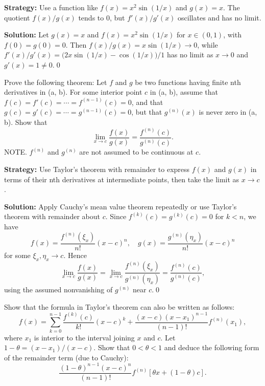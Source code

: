 \noindent\textbf{Strategy:} Use a function like \( f(x) = x^2 \sin(1/x) \) and \( g(x) = x \). The quotient \( f(x)/g(x) \) tends to 0, but \( f'(x)/g'(x) \) oscillates and has no limit.

\bigskip\noindent\textbf{Solution:}
Let $g(x)=x$ and $f(x)=x^2\sin(1/x)$ for $x\in(0,1)$, with $f(0)=g(0)=0$. Then $f(x)/g(x)=x\sin(1/x)\to 0$, while $f'(x)/g'(x)=\big(2x\sin(1/x)-\cos(1/x)\big)/1$ has no limit as $x\to 0$ and $g'(x)=1\ne 0$.\qed


\begin{problembox}
\begin{problemstatement}
Prove the following theorem: Let \( f \) and \( g \) be two functions having finite nth derivatives in (a, b). For some interior point \( c \) in (a, b), assume that \( f(c) = f'(c) = \cdots = f^{(n-1)}(c) = 0 \), and that \( g(c) = g'(c) = \cdots = g^{(n-1)}(c) = 0 \), but that \( g^{(n)}(x) \) is never zero in (a, b). Show that
\[ \lim_{x \to c} \frac{f(x)}{g(x)} = \frac{f^{(n)}(c)}{g^{(n)}(c)}. \]
NOTE. \( f^{(n)} \) and \( g^{(n)} \) are not assumed to be continuous at \( c \).
\end{problemstatement}
\end{problembox}

\noindent\textbf{Strategy:} Use Taylor's theorem with remainder to express \( f(x) \) and \( g(x) \) in terms of their nth derivatives at intermediate points, then take the limit as \( x \to c \).

\bigskip\noindent\textbf{Solution:}
Apply Cauchy's mean value theorem repeatedly or use Taylor's theorem with remainder about $c$. Since $f^{(k)}(c)=g^{(k)}(c)=0$ for $k<n$, we have
\[f(x)=\frac{f^{(n)}(\xi_x)}{n!}(x-c)^n,\quad g(x)=\frac{g^{(n)}(\eta_x)}{n!}(x-c)^n\]
for some $\xi_x,\eta_x\to c$. Hence
\[\lim_{x\to c}\frac{f(x)}{g(x)}=\lim_{x\to c}\frac{f^{(n)}(\xi_x)}{g^{(n)}(\eta_x)}=\frac{f^{(n)}(c)}{g^{(n)}(c)},\]
using the assumed nonvanishing of $g^{(n)}$ near $c$.\qed


\begin{problembox}
\begin{problemstatement}
Show that the formula in Taylor's theorem can also be written as follows:
\[ f(x) = \sum_{k=0}^{n-1} \frac{f^{(k)}(c)}{k!} (x - c)^k + \frac{(x - c)(x - x_1)^{n-1}}{(n - 1)!} f^{(n)}(x_1), \]
where \( x_1 \) is interior to the interval joining \( x \) and \( c \). Let \( 1 - \theta = (x - x_1)/(x - c) \). Show that \( 0 < \theta < 1 \) and deduce the following form of the remainder term (due to Cauchy):
\[ \frac{(1 - \theta)^{n-1}(x - c)^n}{(n - 1)!} f^{(n)}[\theta x + (1 - \theta)c]. \]
\end{problemstatement}
\end{problembox}


